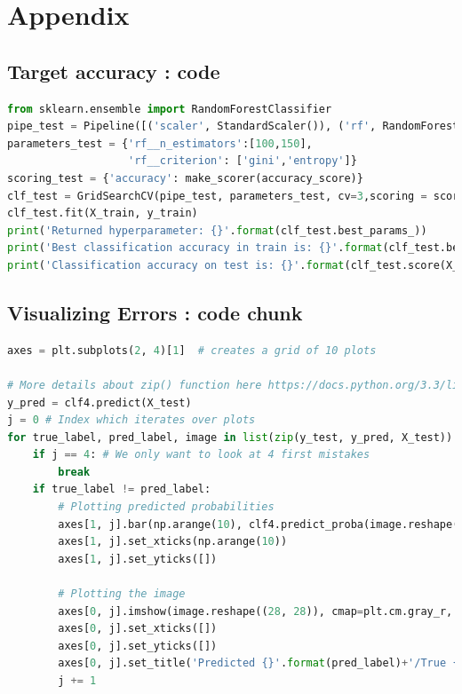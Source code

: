 \section{Appendix}
\subsection{Target accuracy : code}
\label{appendix:targetaccuracy}
\begin{lstlisting}[language=Python]
from sklearn.ensemble import RandomForestClassifier
pipe_test = Pipeline([('scaler', StandardScaler()), ('rf', RandomForestClassifier())])
parameters_test = {'rf__n_estimators':[100,150],
                   'rf__criterion': ['gini','entropy']} 
scoring_test = {'accuracy': make_scorer(accuracy_score)}
clf_test = GridSearchCV(pipe_test, parameters_test, cv=3,scoring = scoring_test, refit='accuracy')
clf_test.fit(X_train, y_train)
print('Returned hyperparameter: {}'.format(clf_test.best_params_))
print('Best classification accuracy in train is: {}'.format(clf_test.best_score_))
print('Classification accuracy on test is: {}'.format(clf_test.score(X_test, y_test)))
\end{lstlisting}

\subsection{Visualizing Errors : code chunk}
\label{appendix:visualizing}
\begin{lstlisting}[language=Python]
axes = plt.subplots(2, 4)[1]  # creates a grid of 10 plots

# More details about zip() function here https://docs.python.org/3.3/library/functions.html#zip
y_pred = clf4.predict(X_test)
j = 0 # Index which iterates over plots
for true_label, pred_label, image in list(zip(y_test, y_pred, X_test)):
    if j == 4: # We only want to look at 4 first mistakes
        break
    if true_label != pred_label:
        # Plotting predicted probabilities
        axes[1, j].bar(np.arange(10), clf4.predict_proba(image.reshape(1, -1))[0]) 
        axes[1, j].set_xticks(np.arange(10))
        axes[1, j].set_yticks([])
        
        # Plotting the image
        axes[0, j].imshow(image.reshape((28, 28)), cmap=plt.cm.gray_r, interpolation='nearest')
        axes[0, j].set_xticks([])
        axes[0, j].set_yticks([])
        axes[0, j].set_title('Predicted {}'.format(pred_label)+'/True {}'.format(true_label),fontsize=8)
        j += 1
\end{lstlisting}
	
